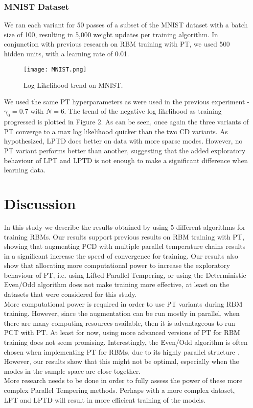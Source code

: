 \subsubsection{MNIST Dataset}
We ran each variant for 50 passes of a subset of the MNIST dataset with a batch size of 100, resulting in 5,000 weight updates per training algorithm. In conjunction with previous research on RBM training with PT, we used 500 hidden units, with a learning rate of 0.01\cite{desjardins2010tempered}. 

\begin{figure}[ht!]
	\centering
	\texttt{[image: MNIST.png]}
\caption{Log Likelihood trend on MNIST.}
\end{figure}

We used the same PT hyperparameters as were used in the previous experiment - $\gamma_0 = 0.7$ with $N=6$. The trend of the negative log likelihood as training progressed is plotted in Figure 2. As can be seen, once again the three variants of PT converge to a max log likelihood quicker than the two CD variants. As hypothesized, LPTD does better on data with more sparse modes. However, no PT variant performs better than another, suggesting that the added exploratory behaviour of LPT and LPTD is not enough to make a significant difference when learning data.  

\section{Discussion}
In this study we describe the results obtained by using 5 different algorithms for training RBMs. Our results support previous results on RBM training with PT, showing that augmenting PCD with multiple parallel temperature chains results in a significant increase the speed of convergence for training. Our results also show that allocating more computational power to increase the exploratory behaviour of PT, i.e. using Lifted Parallel Tempering, or using the Deterministic Even/Odd algorithm does not make training more effective, at least on the datasets that were considered for this study.\\

More computational power is required in order to use PT variants during RBM training. However, since the augmentation can be run mostly in parallel, when there are many computing resources available, then it is advantageous to run PCT with PT. At least for now, using more advanced versions of PT for RBM training does not seem promising. Interestingly, the Even/Odd algorithm is often chosen when implementing PT for RBMs, due to its highly parallel structure \cite{fischer2014training}. However, our results show that this might not be optimal, especially when the modes in the sample space are close together.\\

More research needs to be done in order to fully assess the power of these more complex Parallel Tempering methods. Perhaps with a more complex dataset, LPT and LPTD will result in more efficient training of the models. \\